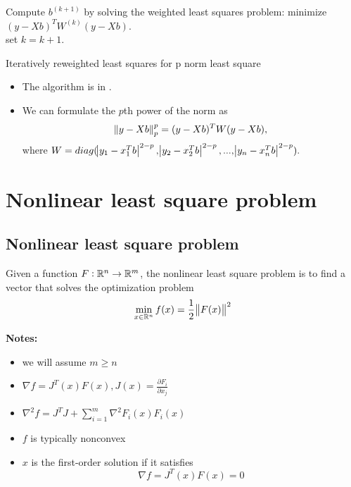 \begin{refsection}
\begin{algorithm}[H]
{		Compute $b^{(k+1)}$ by solving the weighted least squares problem: minimize 
		$(y-Xb)^TW^{(k)}(y-Xb).$\\
		
		set $k = k+1$.		

	}
	
	\caption{Iteratively reweighted least squares for p norm least square}
\end{algorithm}


\begin{remark}\hfill
\begin{itemize}
	\item The algorithm is in \cite[233]{gentle2017matrix}.
	\item We can formulate the $p$th power of the norm as
	$$\norm{y-Xb}_p^p = (y-Xb)^TW(y-Xb),$$
	where $W=diag(\abs{y_1-x_1^Tb}^{2-p},\abs{y_2-x_2^Tb}^{2-p},...,\abs{y_n-x_n^Tb}^{2-p}).$
\end{itemize}	
	
\end{remark}


\section{Nonlinear least square problem}
\subsection{Nonlinear least square problem}
\begin{definition}
Given a function $F:\mathbb{R}^n\rightarrow \mathbb{R}^m$, the nonlinear least square problem is to find a vector that solves the optimization problem
$$\min_{x\in \mathbb{R}^n} f(x) = \frac{1}{2}\norm{F(x)}^2$$
\end{definition}
\begin{remark}
\textbf{Notes:}
\begin{itemize}
	\item we will assume $m \geq n$
	\item $\nabla f = J^T(x)F(x), J(x)=\frac{\partial F_i}{\partial x_j}$
	\item $\nabla^2 f = J^TJ + \sum_{i=1}^m \nabla^2 F_i(x)F_i(x)$
	\item $f$ is typically nonconvex
	\item $x$ is the first-order solution if it satisfies
	$$\nabla f = J^T(x)F(x) = 0$$
\end{itemize}	
\end{remark}



\end{refsection}
